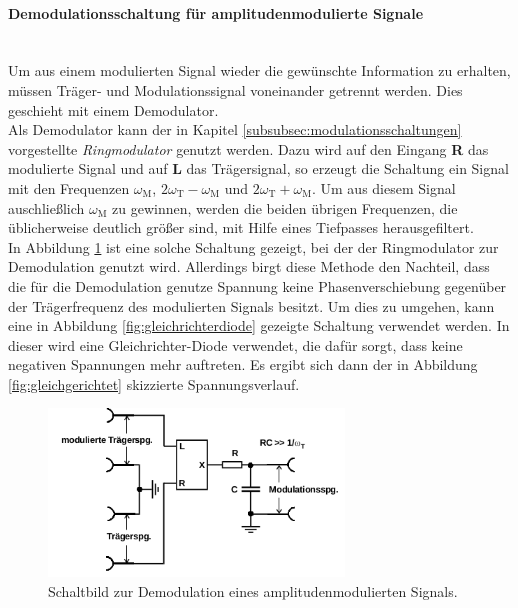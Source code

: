 \paragraph{Demodulationsschaltung für amplitudenmodulierte Signale}
\mbox{}\\
Um aus einem modulierten Signal wieder die gewünschte Information zu erhalten,
müssen Träger- und Modulationssignal voneinander getrennt werden.
Dies geschieht mit einem Demodulator.\\
Als Demodulator kann der in Kapitel \ref{subsubsec:modulationsschaltungen}
vorgestellte \textit{Ringmodulator} genutzt werden.
Dazu wird auf den Eingang \textbf{R} das modulierte Signal und
auf \textbf{L} das Trägersignal, so erzeugt die Schaltung
ein Signal mit den Frequenzen
$\omega_{\text{M}}$, $2\omega_{\text{T}} - \omega_{\text{M}}$
und $2\omega_{\text{T}} + \omega_{\text{M}}$.
Um aus diesem Signal auschließlich $\omega_{\text{M}}$ zu gewinnen,
werden die beiden übrigen Frequenzen, die üblicherweise deutlich größer sind,
mit Hilfe eines Tiefpasses herausgefiltert.\\
In Abbildung \ref{fig:demodulatorschaltung} ist eine solche Schaltung gezeigt,
bei der der Ringmodulator zur Demodulation genutzt wird. Allerdings
birgt diese Methode den Nachteil, dass die für die Demodulation genutze
Spannung keine Phasenverschiebung gegenüber der Trägerfrequenz des
modulierten Signals besitzt.
Um dies zu umgehen, kann eine in Abbildung \ref{fig:gleichrichterdiode} gezeigte
Schaltung verwendet werden. In dieser wird eine Gleichrichter-Diode verwendet,
die dafür sorgt, dass keine negativen Spannungen mehr auftreten.
Es ergibt sich dann der in Abbildung \ref{fig:gleichgerichtet}
skizzierte Spannungsverlauf.




\begin{figure}
\centering
\includegraphics[width=0.7\textwidth]{figures/demodulator.PNG}
\caption{Schaltbild zur Demodulation eines amplitudenmodulierten Signals.\cite{sample}}
\label{fig:demodulatorschaltung}
\end{figure}

